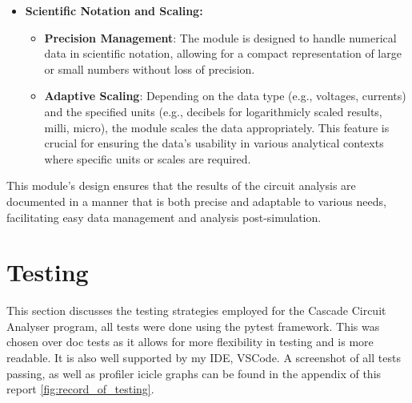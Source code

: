 \documentclass[conference]{IEEEtran}
\begin{document}
\begin{itemize}
      \item \textbf{Scientific Notation and Scaling:}
            \begin{itemize}
                  \item \textbf{Precision Management}: The module is designed to handle numerical data in scientific notation, allowing for a
                        compact representation of large or small numbers without loss of precision.
                  \item \textbf{Adaptive Scaling}: Depending on the data type (e.g., voltages, currents) and the specified units (e.g., decibels
                        for logarithmicly scaled results, milli, micro), the module scales the data appropriately. This feature is crucial for ensuring the data's
                        usability in various analytical contexts where specific units or scales are required.
            \end{itemize}
\end{itemize}

This module's design ensures that the results of the circuit analysis are documented in a manner that is both precise and adaptable to
various needs, facilitating easy data management and analysis post-simulation.

\section{Testing}
This section discusses the testing strategies employed for the Cascade Circuit Analyser program, all tests were done using the pytest framework.
This was chosen over doc tests as it allows for more flexibility in testing and is more readable. It is also well supported by my IDE, VSCode.
A screenshot of all tests passing, as well as profiler icicle graphs can be found in the appendix of this report \ref{fig:record_of_testing}.
\end{document}
